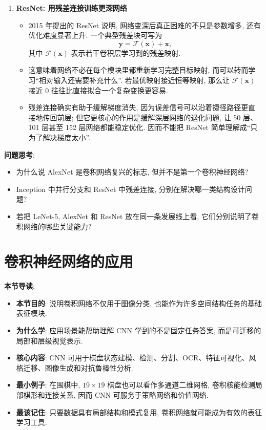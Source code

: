 \documentclass{../nndlcourse}
\begin{document}
\begin{enumerate}
    \item \textbf{ResNet: 用残差连接训练更深网络}
    \begin{itemize}
        \item 2015 年提出的 ResNet 说明, 网络变深后真正困难的不只是参数增多, 还有优化难度显著上升. 一个典型残差块可写为
        \begin{equation*}
            \boldsymbol{y} = \mathcal{F}(\boldsymbol{x}) + \boldsymbol{x},
        \end{equation*}
        其中 $\mathcal{F}(\boldsymbol{x})$ 表示若干卷积层学习到的残差映射.
        \item 这意味着网络不必在每个模块里都重新学习完整目标映射, 而可以转而学习“相对输入还需要补充什么”. 若最优映射接近恒等映射, 那么让 $\mathcal{F}(\boldsymbol{x})$ 接近 0 往往比直接拟合一个复杂变换更容易.
        \item 残差连接确实有助于缓解梯度消失, 因为误差信号可以沿着捷径路径更直接地传回前层; 但它更核心的作用是缓解深层网络的退化问题, 让 50 层、101 层甚至 152 层网络都能稳定优化. 因而不能把 ResNet 简单理解成“只为了解决梯度太小”.
    \end{itemize}
\end{enumerate}

\textbf{问题思考}:
\begin{itemize}
    \item 为什么说 AlexNet 是卷积网络复兴的标志, 但并不是第一个卷积神经网络?
    \item Inception 中并行分支和 ResNet 中残差连接, 分别在解决哪一类结构设计问题?
    \item 若把 LeNet-5, AlexNet 和 ResNet 放在同一条发展线上看, 它们分别说明了卷积网络的哪些关键能力?
\end{itemize}

\section{卷积神经网络的应用}
\textbf{本节导读}:
\begin{itemize}
    \item \textbf{本节目的}: 说明卷积网络不仅用于图像分类, 也能作为许多空间结构任务的基础表征模块.
    \item \textbf{为什么学}: 应用场景能帮助理解 CNN 学到的不是固定任务答案, 而是可迁移的局部和层级视觉表示.
    \item \textbf{核心内容}: CNN 可用于棋盘状态建模、检测、分割、OCR、特征可视化、风格迁移、图像生成和对抗鲁棒性分析.
    \item \textbf{最小例子}: 在围棋中, $19\times19$ 棋盘也可以看作多通道二维网格, 卷积核能检测局部棋形和连接关系, 因而 CNN 可服务于策略网络和价值网络.
    \item \textbf{最该记住}: 只要数据具有局部结构和模式复用, 卷积网络就可能成为有效的表征学习工具.
\end{itemize}
\end{document}
